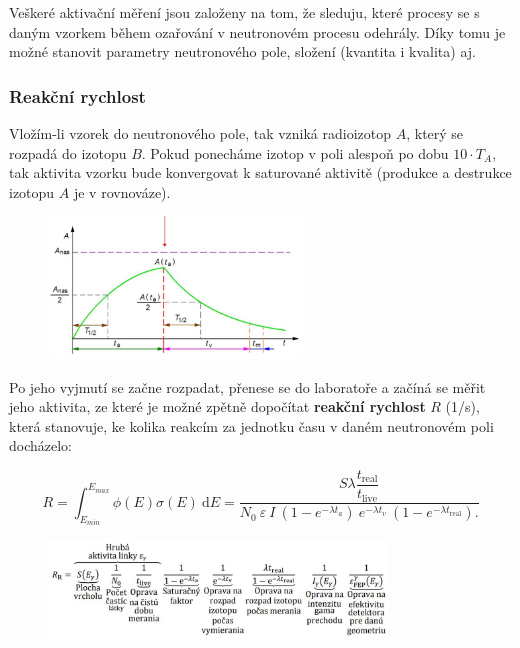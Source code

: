 Veškeré aktivační měření jsou založeny na tom, že sleduju, které procesy se s daným vzorkem během ozařování v neutronovém procesu odehrály. Díky tomu je možné stanovit parametry neutronového pole, složení (kvantita i kvalita) aj.

\subsubsection{Reakční rychlost}

Vložím-li vzorek do neutronového pole, tak vzniká radioizotop $A$, který se rozpadá do izotopu $B$. Pokud ponecháme izotop v poli alespoň po dobu $10 \cdot T_A$, tak aktivita vzorku bude konvergovat k saturované aktivitě (produkce a destrukce izotopu $A$ je v rovnováze). 

\begin{figure}[H]
    \centering
    \includegraphics[width=0.6\textwidth]{img/saturovana_aktivita.JPG}
\end{figure}

Po jeho vyjmutí se začne rozpadat, přenese se do laboratoře a začíná se měřit jeho aktivita, ze které je možné zpětně dopočítat \textbf{reakční rychlost} $R$ (1/s), která stanovuje, ke kolika reakcím za jednotku času v daném neutronovém poli docházelo:

$$ \boxed{R = \int_{E_{min}}^{E_{max}} \phi(E) \sigma(E) \: \text{d}E = \dfrac{S \lambda \dfrac{t_\text{real}}{t_\text{live}}}{N_0 \: \varepsilon \: I \: (1-e^{-\lambda t_a}) \: e^{-\lambda t_v} \: (1-e^{-\lambda t_\text{real}}).}} $$

\begin{figure}[H]
    \centering
    \includegraphics[width=0.8\textwidth]{img/RR_vyznam.JPG}
\end{figure}

